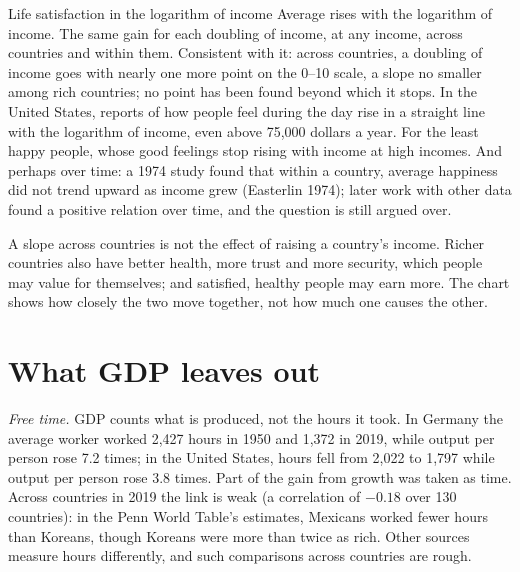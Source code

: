 \begin{model}{Life satisfaction in the logarithm of income}
\assumes Average  rises with the logarithm of income.
\predicts The same gain for each doubling of income, at any income, across countries and within them.
\tested Consistent with it: across countries, a doubling of income goes with nearly one more point on the 0--10 scale, a slope no smaller among rich countries; no point has been found beyond
  which it stops. In the United States, reports of how people feel during the day rise in a straight line with the logarithm of income, even above 75,000 dollars a year.
\breaks For the least happy people, whose good feelings stop rising with income at high incomes. And perhaps over time: a 1974 study found that within a
  country, average happiness did not trend upward as income grew (Easterlin 1974); later work with other data found a positive relation over time, and the
  question is still argued over.
\end{model}

A slope across countries is not the effect of raising a country's income. Richer countries also have better health, more trust and more security, which people may value for
themselves; and satisfied, healthy people may earn more. The chart shows how closely the two move together, not how much one causes the other.

\section{What GDP leaves out}\label{sec:g12:income-and-wellbeing:leaves-out}

\emph{Free time.} GDP counts what is produced, not the hours it took. In Germany the average worker worked 2,427 hours in 1950 and 1,372 in 2019, while output per person rose
7.2 times; in the United States, hours fell from 2,022 to 1,797 while output per person rose 3.8 times. Part of the gain from growth was taken as time. Across countries in 2019
the link is weak (a correlation of $-0.18$ over 130 countries): in the Penn World Table's estimates, Mexicans worked fewer hours than Koreans, though Koreans were more
than twice as rich. Other sources measure hours differently, and such comparisons across countries are rough.

